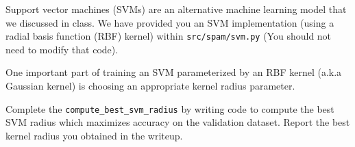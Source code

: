 \item {}
Support vector machines (SVMs) are an alternative machine learning model that we discussed in class.
We have provided you an SVM implementation (using a radial basis function (RBF) kernel) within \texttt{src/spam/svm.py} (You should not need to modify that code).

One important part of training an SVM parameterized by an RBF kernel (a.k.a Gaussian kernel) is choosing an appropriate kernel radius parameter.

Complete the \texttt{compute\_best\_svm\_radius} by writing code to compute the best SVM radius which maximizes accuracy on the validation dataset. Report the best kernel radius you obtained in the writeup.\\[50pt]